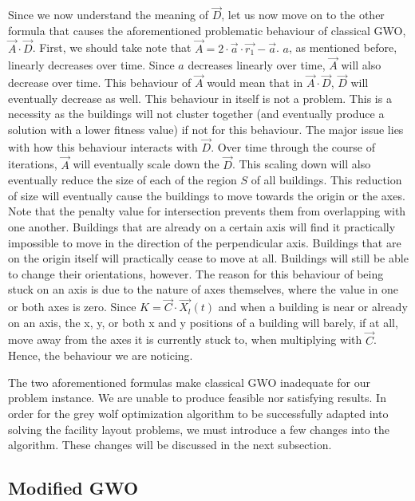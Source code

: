Since we now understand the meaning of $\vec{D}$, let us now move on to the other formula that causes the aforementioned problematic behaviour of classical GWO, $\vec{A} \cdot \vec{D}$. First, we should take note that $\vec{A} = 2 \cdot \vec{a} \cdot \vec{r_{1}} - \vec{a}$. $a$, as mentioned before, linearly decreases over time. Since $a$ decreases linearly over time, $\vec{A}$ will also decrease over time. This behaviour of $\vec{A}$ would mean that in $\vec{A} \cdot \vec{D}$, $\vec{D}$ will eventually decrease as well. This behaviour in itself is not a problem. This is a necessity as the buildings will not cluster together (and eventually produce a solution with a lower fitness value) if not for this behaviour. The major issue lies with how this behaviour interacts with $\vec{D}$. Over time through the course of iterations, $\vec{A}$ will eventually scale down the $\vec{D}$. This scaling down will also eventually reduce the size of each of the region $S$ of all buildings. This reduction of size will eventually cause the buildings to move towards the origin or the axes. Note that the penalty value for intersection prevents them from overlapping with one another. Buildings that are already on a certain axis will find it practically impossible to move in the direction of the perpendicular axis. Buildings that are on the origin itself will practically cease to move at all. Buildings will still be able to change their orientations, however. The reason for this behaviour of being stuck on an axis is due to the nature of axes themselves, where the value in one or both axes is zero. Since $K = \vec{C} \cdot \vec{X_{l}}(t)$ and when a building is near or already on an axis, the x, y, or both x and y positions of a building will barely, if at all, move away from the axes it is currently stuck to, when multiplying with $\vec{C}$. Hence, the behaviour we are noticing.

The two aforementioned formulas make classical GWO inadequate for our problem instance. We are unable to produce feasible nor satisfying results. In order for the grey wolf optimization algorithm to be successfully adapted into solving the facility layout problems, we must introduce a few changes into the algorithm. These changes will be discussed in the next subsection.

\subsection{Modified GWO}

